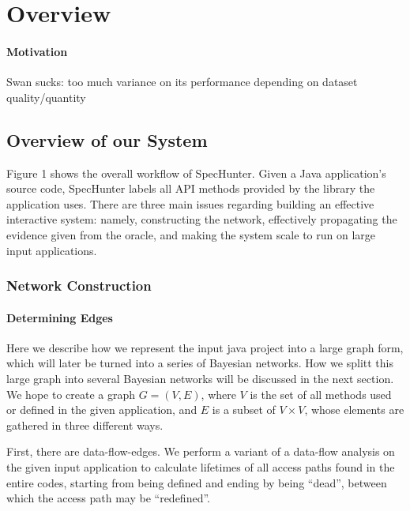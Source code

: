 \section{Overview}

\paragraph{Motivation}

Swan sucks: too much variance on its performance depending on dataset quality/quantity

\subsection{Overview of our System}


Figure 1 shows the overall workflow of SpecHunter. Given a Java application's
source code, SpecHunter labels all API methods provided by the library the application
uses. There are three main issues regarding building an effective interactive system:
namely, constructing the network, effectively propagating the evidence given from the
oracle, and making the system scale to run on large input applications.

\subsubsection{Network Construction}

\paragraph{Determining Edges}

Here we describe how we represent the input java project into a large graph form, which will
later be turned into a series of Bayesian networks. How we splitt this large
graph into several Bayesian networks will be discussed in the next section. %
We hope to create a graph $G=(V, E)$,
where $V$ is the set of all methods used or defined in the given application, and $E$ is a
subset of $V\times V$, whose elements are gathered in three different ways. 

First, there are data-flow-edges. We perform a variant of a data-flow analysis on the
given input application to calculate lifetimes of all access paths found in the
entire codes, starting from being defined and ending by being ``dead'', between
which the access path may be ``redefined''.

